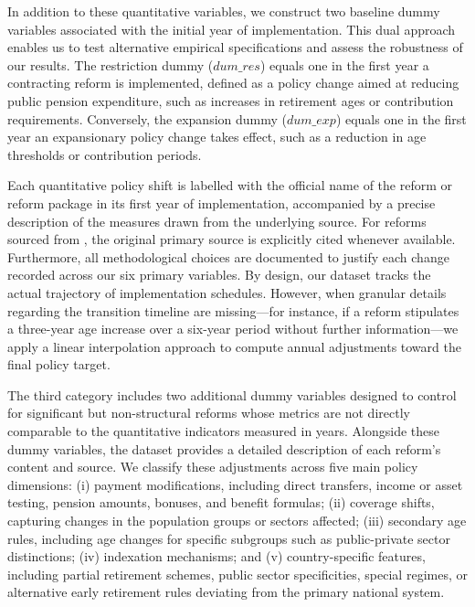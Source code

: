 \documentclass[11pt,english,a4paper, twoside, authoryear]{article}
\begin{document}
In addition to these quantitative variables, we construct two baseline dummy variables associated with the initial year of implementation. This dual approach enables us to test alternative empirical specifications and assess the robustness of our results. The restriction dummy ($dum\_res$) equals one in the first year a contracting reform is implemented, defined as a policy change aimed at reducing public pension expenditure, such as increases in retirement ages or contribution requirements. Conversely, the expansion dummy ($dum\_exp$) equals one in the first year an expansionary policy change takes effect, such as a reduction in age thresholds or contribution periods.

Each quantitative policy shift is labelled with the official name of the reform or reform package in its first year of implementation, accompanied by a precise description of the measures drawn from the underlying source. For reforms sourced from \citet{romp_political_2024}, the original primary source is explicitly cited whenever available. Furthermore, all methodological choices are documented to justify each change recorded across our six primary variables. By design, our dataset tracks the actual trajectory of implementation schedules. However, when granular details regarding the transition timeline are missing---for instance, if a reform stipulates a three-year age increase over a six-year period without further information---we apply a linear interpolation approach to compute annual adjustments toward the final policy target.


The third category includes two additional dummy variables designed to control for significant but non-structural reforms whose metrics are not directly comparable to the quantitative indicators measured in years. Alongside these dummy variables, the dataset provides a detailed description of each reform's content and source. We classify these adjustments across five main policy dimensions: (i) payment modifications, including direct transfers, income or asset testing, pension amounts, bonuses, and benefit formulas; (ii) coverage shifts, capturing changes in the population groups or sectors affected; (iii) secondary age rules, including age changes for specific subgroups such as public-private sector distinctions; (iv) indexation mechanisms; and (v) country-specific features, including partial retirement schemes, public sector specificities, special regimes, or alternative early retirement rules deviating from the primary national system.
\end{document}
